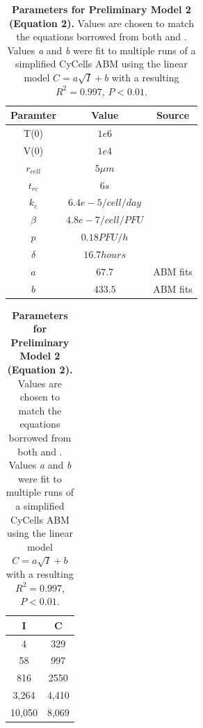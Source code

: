 \documentclass[preprint,10pt,authoryear]{article}
\begin{document}
\begin{table}[!ht]
\begin{center}
\begin{tabular}{ | c | c | c |}
  \hline                        
  Paramter & Value & Source \\
  \hline
  T(0) & $1e6$ & \citep{Mitchell2011} \\
  V(0) &  $1e4$ & \citep{Mitchell2011} \\
  $r_{cell}$ &  $5 \mu m$ & \citep{Miao2010a} \\
  $t_{rc}$ & $6s$ & \citep{Peters1983} \\
  $k_e$ & $6.4e-5/cell/day$ & \citep{Miao2010a} \\
  $\beta$ & $4.8e-7/cell/PFU$ & \citep{Mitchell2011} \\
  $p$ & $0.18 PFU/h$ & \citep{Mitchell2011} \\
  $\delta$ & $16.7 hours$ & \citep{Mitchell2011} \\
  $a$ & $67.7$ & ABM fits \\
  $b$ & $433.5$ & ABM fits \\
  \hline  
\end{tabular}
\begin{tabular}{| c | c |}
  \hline
  I & C \\
  \hline
  4 & 329 \\
  58 & 997 \\
  816 & 2550 \\
  3,264 & 4,410 \\
  10,050 & 8,069 \\
  \hline
\end{tabular}
\caption{\textbf{Parameters for Preliminary Model 2 (Equation 2).}  Values are chosen to match the equations borrowed from both \citep{Mitchell2011} and \citep{Miao2010a}.  Values \textit{a} and \textit{b} were fit to multiple runs of a simplified CyCells ABM using the linear model $C = a\sqrt{I}+b$ with a resulting $R^2 = 0.997$, $P < 0.01$.}
\label{tab:supplement}
\end{center}
\end{table}
\end{document}
